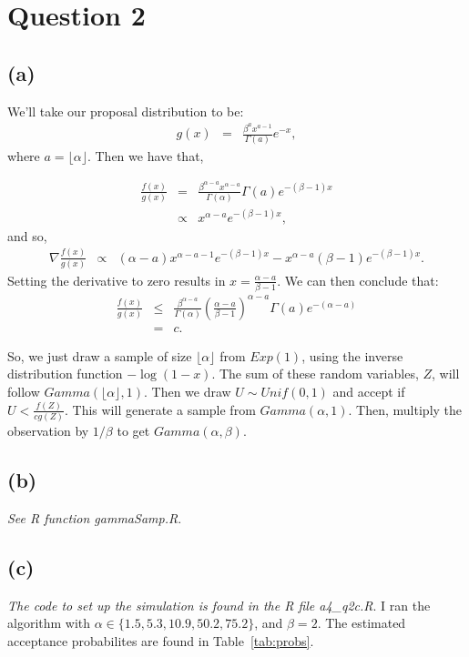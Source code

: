 \documentclass{article}\usepackage[]{graphicx}\usepackage[]{color}
\begin{document}
\section*{Question 2}
\subsection*{(a)}
We'll take our proposal distribution to be:
\begin{eqnarray*}
  g(x) &=& \frac{\beta^a x^{a-1}}{\Gamma(a)}e^{-x},
\end{eqnarray*}
where $a=\lfloor\alpha\rfloor$.  Then we have that,

\begin{eqnarray*}
  \frac{f(x)}{g(x)} &=& \frac{\beta^{\alpha-a} x^{\alpha-a}}{\Gamma(\alpha)}\Gamma(a) e^{-(\beta-1)x} \\
  &\propto&  x^{\alpha-a}e^{-(\beta-1)x},
\end{eqnarray*}
and so,
\begin{eqnarray*}
  \nabla \frac{f(x)}{g(x)} &\propto& (\alpha-a)x^{\alpha-a-1}e^{-(\beta-1)x}-x^{\alpha-a}(\beta-1)e^{-(\beta-1)x}.  
\end{eqnarray*}
Setting the derivative to zero results in $x=\frac{\alpha-a}{\beta-1}$.  We can then conclude that:
\begin{eqnarray*}
  \frac{f(x)}{g(x)} &\leq& \frac{\beta^{\alpha-a}}{\Gamma(\alpha)}\left(\frac{\alpha-a}{\beta-1}\right)^{\alpha-a} \Gamma(a) e^{-(\alpha-a)} \\
  &=& c.
\end{eqnarray*}

So, we just draw a sample of size $\lfloor\alpha\rfloor$ from $Exp(1)$, using the inverse distribution function $-\log(1-x)$.  The sum of these random variables, $Z$, will follow $Gamma(\lfloor\alpha\rfloor,1)$.  Then we draw $U \sim Unif(0,1)$ and accept if $U<\frac{f(Z)}{cg(Z)}$.  This will generate a sample from $Gamma(\alpha,1)$.  Then, multiply the observation by $1/\beta$ to get $Gamma(\alpha,\beta)$.

\subsection*{(b)}
\emph{See R function gammaSamp.R}.

\subsection*{(c)}
\emph{The code to set up the simulation is found in the R file a4\_q2c.R}.  I ran the algorithm with $\alpha \in \{ 1.5, 5.3, 10.9, 50.2, 75.2 \}$, and $\beta=2$.  The estimated acceptance probabilites are found in Table~\ref{tab:probs}.
\end{document}
